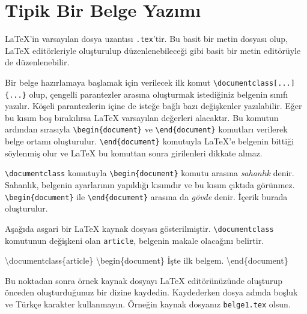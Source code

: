 \documentclass[
  letterpaper,
  DIV=11,
  numbers=noendperiod]{scrreprt}
\newenvironment{Shaded}{\begin{snugshade}}{\end{snugshade}}
\newcommand{\BuiltInTok}[1]{\textcolor[rgb]{0.00,0.23,0.31}{#1}}
\newcommand{\ExtensionTok}[1]{\textcolor[rgb]{0.00,0.23,0.31}{#1}}
\newcommand{\KeywordTok}[1]{\textcolor[rgb]{0.00,0.23,0.31}{#1}}
\newcommand{\NormalTok}[1]{\textcolor[rgb]{0.00,0.23,0.31}{#1}}
\begin{document}
\hypertarget{tipik-bir-belge-yazux131mux131}{%
\section{Tipik Bir Belge Yazımı}\label{tipik-bir-belge-yazux131mux131}}

{\LaTeX}'in varsayılan dosya uzantısı \texttt{.tex}'tir. Bu basit bir
metin dosyası olup, {\LaTeX} editörleriyle oluşturulup düzenlenebileceği
gibi basit bir metin editörüyle de düzenlenebilir.

Bir belge hazırlamaya başlamak için verilecek ilk komut
\texttt{\textbackslash{}documentclass{[}...{]}\{...\}} olup, çengelli
parantezler arasına oluşturmak istediğiniz belgenin sınıfı yazılır.
Köşeli parantezlerin içine de isteğe bağlı bazı değişkenler yazılabilir.
Eğer bu kısım boş bırakılırsa {\LaTeX} varsayılan değerleri alacaktır.
Bu komutun ardından sırasıyla \texttt{\textbackslash{}begin\{document\}}
ve \texttt{\textbackslash{}end\{document\}} komutları verilerek belge
ortamı oluşturulur. \texttt{\textbackslash{}end\{document\}} komutuyla
{\LaTeX}'e belgenin bittiği söylenmiş olur ve {\LaTeX} bu komuttan sonra
girilenleri dikkate almaz.

\texttt{\textbackslash{}documentclass} komutuyla
\texttt{\textbackslash{}begin\{document\}} komutu arasına
\emph{sahanlık} denir. Sahanlık, belgenin ayarlarının yapıldığı kısımdır
ve bu kısım çıktıda görünmez. \texttt{\textbackslash{}begin\{document\}}
ile \texttt{\textbackslash{}end\{document\}} arasına da \emph{gövde}
denir. İçerik burada oluşturulur.

Aşağıda asgari bir {\LaTeX} kaynak dosyası gösterilmiştir.
\texttt{\textbackslash{}documentclass} komutunun değişkeni olan
\texttt{article}, belgenin makale olacağını belirtir.

\begin{Shaded}
\begin{Highlighting}[]
\BuiltInTok{\textbackslash{}documentclass}\NormalTok{\{}\ExtensionTok{article}\NormalTok{\}}
\KeywordTok{\textbackslash{}begin}\NormalTok{\{}\ExtensionTok{document}\NormalTok{\}}
\NormalTok{  İşte ilk belgem.}
\KeywordTok{\textbackslash{}end}\NormalTok{\{}\ExtensionTok{document}\NormalTok{\}}
\end{Highlighting}
\end{Shaded}

Bu noktadan sonra örnek kaynak dosyayı {\LaTeX} editörünüzünde oluşturup
önceden oluşturduğunuz bir dizine kaydedin. Kaydederken dosya adında
boşluk ve Türkçe karakter kullanmayın. Örneğin kaynak dosyanız
\texttt{belge1.tex} olsun.
\end{document}
